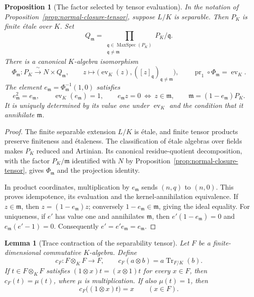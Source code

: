 \documentclass[11pt]{article}
\newtheorem{proposition}[theorem]{Proposition}
\newtheorem{lemma}[theorem]{Lemma}
\theoremstyle{definition}
\theoremstyle{remark}
\begin{document}
\begin{proposition}[The factor selected by tensor evaluation]
\label{prop:normal-closure-factor}
In the notation of Proposition~\ref{prop:normal-closure-tensor}, suppose
\(L/K\) is separable. Then \(P_K\) is finite \'{e}tale over \(K\).
Set
\[
  Q_{\mathfrak m}
    =\prod_{\substack{\mathfrak q\in\operatorname{MaxSpec}(P_K)\\
                       \mathfrak q\ne\mathfrak m}} P_K/\mathfrak q.
\]
There is a canonical \(K\)-algebra isomorphism
\[
  \Phi_{\mathfrak m}:P_K\xrightarrow{\ \sim\ }N\times Q_{\mathfrak m},
  \qquad z\longmapsto
      \bigl(\operatorname{ev}_K(z),([z]_{\mathfrak q})_{\mathfrak q\ne\mathfrak m}\bigr),
  \qquad \operatorname{pr}_1\circ\Phi_{\mathfrak m}=\operatorname{ev}_K.
\]
The element \(e_{\mathfrak m}=\Phi_{\mathfrak m}^{-1}(1,0)\) satisfies
\[
  e_{\mathfrak m}^2=e_{\mathfrak m},\qquad
  \operatorname{ev}_K(e_{\mathfrak m})=1,\qquad
  e_{\mathfrak m}z=0\ \Longleftrightarrow\ z\in\mathfrak m,\qquad
  \mathfrak m=(1-e_{\mathfrak m})P_K.
\]
It is uniquely determined by its value one under \(\operatorname{ev}_K\)
and the condition that it annihilate \(\mathfrak m\).
\end{proposition}

\begin{proof}
The finite separable extension \(L/K\) is \'{e}tale, and finite tensor
products preserve finiteness and \'{e}taleness. The classification of
\'{e}tale algebras over fields~\cite{StacksEtaleOverField} makes \(P_K\)
reduced and Artinian. Its canonical residue-quotient decomposition,
with the factor \(P_K/\mathfrak m\) identified with \(N\) by
Proposition~\ref{prop:normal-closure-tensor}, gives \(\Phi_{\mathfrak m}\)
and the projection identity.

In product coordinates, multiplication by \(e_{\mathfrak m}\) sends
\((n,q)\) to \((n,0)\). This proves idempotence, its evaluation and the
kernel-annihilation equivalence. If \(z\in\mathfrak m\), then
\(z=(1-e_{\mathfrak m})z\); conversely \(1-e_{\mathfrak m}\in\mathfrak m\),
giving the ideal equality. For uniqueness, if \(e'\) has value one and
annihilates \(\mathfrak m\), then
\(e'(1-e_{\mathfrak m})=0\) and \(e_{\mathfrak m}(e'-1)=0\).
Consequently \(e'=e'e_{\mathfrak m}=e_{\mathfrak m}\).
\end{proof}

\begin{lemma}[Trace contraction of the separability tensor]
\label{lem:separability-trace}
Let \(F\) be a finite-dimensional commutative \(K\)-algebra. Define
\[
  c_F:F\otimes_K F\longrightarrow F,
  \qquad c_F(a\otimes b)=a\operatorname{Tr}_{F/K}(b).
\]
If \(t\in F\otimes_K F\) satisfies
\((1\otimes x)t=(x\otimes1)t\) for every \(x\in F\), then
\(c_F(t)=\mu(t)\), where \(\mu\) is multiplication.
If also \(\mu(t)=1\), then
\[
  c_F\bigl((1\otimes x)t\bigr)=x\qquad(x\in F).
\]
\end{lemma}
\end{document}
